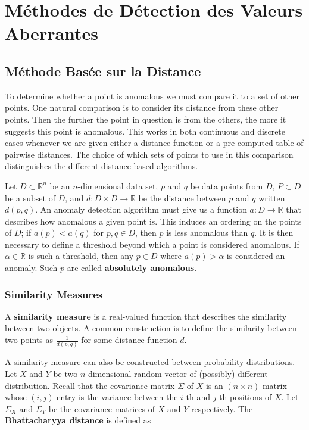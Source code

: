 \section{Méthodes de Détection des Valeurs Aberrantes}

\subsection{Méthode Basée sur la Distance}

To determine whether a point is anomalous we must compare it to a set of other points. 
One natural comparison is to consider its distance from these other points.
Then the further the point in question is from the others,
the more it suggests this point is anomalous.
This works in both continuous and discrete cases whenever we are given either a distance function or a pre-computed table of pairwise distances.
The choice of which sets of points to use in this comparison distinguishes the different distance based algorithms.

Let $D \subset \mathbb{R}^n$ be an $n$-dimensional data set, 
$p$ and $q$ be data points from $D$, 
$P \subset D$ be a subset of $D$, 
and $d: D \times D \to \mathbb{R}$ be the distance between $p$ and $q$ written $d(p,q)$.
An anomaly detection algorithm must give us a function $a : D \to \mathbb{R}$ that describes how anomalous a given point is.
This induces an ordering on the points of $D$;
if $a(p) < a(q)$ for $p,q \in D$, then $p$ is less anomalous than $q$.
It is then necessary to define a threshold beyond which a point is considered anomalous.
If $\alpha \in \mathbb{R}$ is such a threshold, then any $p \in D$ where $a(p) > \alpha$ is considered an anomaly.
Such $p$ are called \textbf{absolutely anomalous}.

\subsubsection*{Similarity Measures}

A \textbf{similarity measure} is a real-valued function that describes the similarity between two objects.
A common construction is to define the similarity between two points as $\frac{1}{d(p,q)}$ for some distance function $d$.

A similarity measure can also be constructed between probability distributions.
Let $X$ and $Y$ be two $n$-dimensional random vector of (possibly) different distribution.
Recall that the covariance matrix $\Sigma$ of $X$ is an $(n \times n)$ matrix whose $(i,j)$-entry is the variance between the $i$-th and $j$-th positions of $X$.
Let $\Sigma_X$ and $\Sigma_Y$ be the covariance matrices of $X$ and $Y$ respectively.
The \textbf{Bhattacharyya distance} is defined as 

